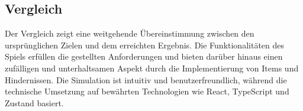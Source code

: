 \documentclass[hidelinks,12pt]{article}
\begin{document}
\subsection{Vergleich}
Der Vergleich zeigt eine weitgehende Übereinstimmung zwischen den ursprünglichen Zielen und dem erreichten Ergebnis. Die Funktionalitäten des Spiels erfüllen die gestellten Anforderungen und bieten darüber hinaus einen zufälligen und unterhaltsamen Aspekt durch die Implementierung von Items und Hindernissen. Die Simulation ist intuitiv und benutzerfreundlich, während die technische Umsetzung auf bewährten Technologien wie React, TypeScript und Zustand basiert.
\end{document}
